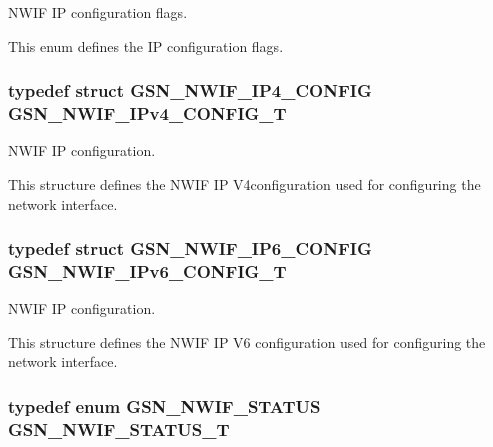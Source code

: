 NWIF IP configuration flags. 

This enum defines the IP configuration flags. \hypertarget{a00670_ga30485b44668b2a98ecdc5571f9a6fed5}{
\subsubsection[{GSN\_\-NWIF\_\-IPv4\_\-CONFIG\_\-T}]{\setlength{\rightskip}{0pt plus 5cm}typedef struct {\bf GSN\_\-NWIF\_\-IP4\_\-CONFIG}  {\bf GSN\_\-NWIF\_\-IPv4\_\-CONFIG\_\-T}}}
\label{a00670_ga30485b44668b2a98ecdc5571f9a6fed5}


NWIF IP configuration. 

This structure defines the NWIF IP V4configuration used for configuring the network interface. \hypertarget{a00670_gab09a924a18be9757c337786abe5903f0}{
\subsubsection[{GSN\_\-NWIF\_\-IPv6\_\-CONFIG\_\-T}]{\setlength{\rightskip}{0pt plus 5cm}typedef struct {\bf GSN\_\-NWIF\_\-IP6\_\-CONFIG}  {\bf GSN\_\-NWIF\_\-IPv6\_\-CONFIG\_\-T}}}
\label{a00670_gab09a924a18be9757c337786abe5903f0}


NWIF IP configuration. 

This structure defines the NWIF IP V6 configuration used for configuring the network interface. \hypertarget{a00670_ga31b009654c9ee4d7037151b19f1f213a}{
\subsubsection[{GSN\_\-NWIF\_\-STATUS\_\-T}]{\setlength{\rightskip}{0pt plus 5cm}typedef enum {\bf GSN\_\-NWIF\_\-STATUS}  {\bf GSN\_\-NWIF\_\-STATUS\_\-T}}}
\label{a00670_ga31b009654c9ee4d7037151b19f1f213a}


